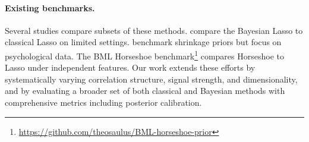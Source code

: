 \paragraph{Existing benchmarks.}
Several studies compare subsets of these methods.
\citet{park2008bayesian} compare the Bayesian Lasso to classical Lasso on limited settings.
\citet{van2019shrinkage} benchmark shrinkage priors but focus on psychological data.
The BML Horseshoe benchmark\footnote{\url{https://github.com/theosaulus/BML-horseshoe-prior}} compares Horseshoe to Lasso under independent features.
Our work extends these efforts by systematically varying correlation structure, signal strength, and dimensionality, and by evaluating a broader set of both classical and Bayesian methods with comprehensive metrics including posterior calibration.
